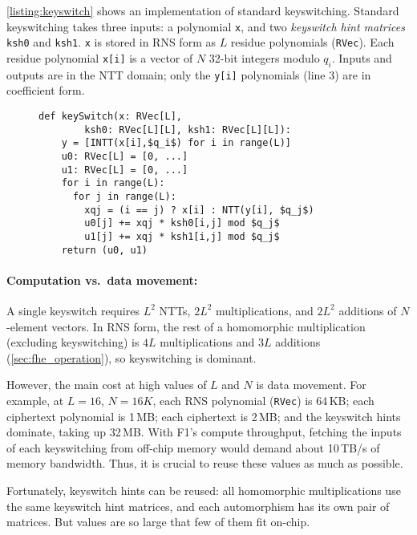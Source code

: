\autoref{listing:keyswitch} shows an implementation of standard keyswitching.
Standard keyswitching takes three inputs: a polynomial \texttt{x}, and two
\emph{keyswitch hint matrices} \texttt{ksh0} and \texttt{ksh1}. \texttt{x} is
stored in RNS form as $L$ residue polynomials (\texttt{RVec}). Each residue
polynomial \texttt{x[i]} is a vector of $N$ 32-bit integers modulo $q_i$.
Inputs and outputs are in the NTT domain; only the \texttt{y[i]} polynomials
(line 3) are in coefficient form.


\begin{figure}
\begin{center}
  \begin{lstlisting}[caption={Standard keyswitch implementation. \texttt{RVec} is an $N$-element vector of 32-bit values, storing a single RNS polynomial in either the coefficient or the NTT domain.
    }, mathescape=true, style=custompython, label=listing:keyswitch]
  def keySwitch(x: RVec[L],
        ksh0: RVec[L][L], ksh1: RVec[L][L]):
    y = [INTT(x[i],$q_i$) for i in range(L)]
    u0: RVec[L] = [0, ...]
    u1: RVec[L] = [0, ...]
    for i in range(L):
      for j in range(L):
        xqj = (i == j) ? x[i] : NTT(y[i], $q_j$)
        u0[j] += xqj * ksh0[i,j] mod $q_j$
        u1[j] += xqj * ksh1[i,j] mod $q_j$
    return (u0, u1)
  \end{lstlisting}
\end{center}
\end{figure}

\paragraph{Computation vs.\ data movement:}
A single keyswitch requires $L^2$ NTTs, $2L^2$ multiplications, and $2L^2$
additions of $N$-element \mbox{vectors}. In RNS form, the rest of a homomorphic
multiplication (excluding keyswitching) is $4L$ multiplications and $3L$
additions (\autoref{sec:fhe_operation}), so keyswitching is dominant.

However, the main cost at high values of $L$ and $N$ is data movement. For
example, at $L = 16$, $N = 16K$, each RNS polynomial (\texttt{RVec}) is 64\,KB;
each ciphertext polynomial is 1\,MB; each ciphertext is 2\,MB; and the
keyswitch hints dominate, taking up 32\,MB. With F1's compute throughput,
fetching the inputs of each keyswitching from off-chip memory would demand
about 10\,TB/s of memory bandwidth. Thus, it is crucial to reuse these values
as much as possible.

Fortunately, keyswitch hints can be reused: all homomorphic multiplications use
the same keyswitch hint matrices, and each automorphism has its own pair of
matrices. But values are so large that few of them fit on-chip.

